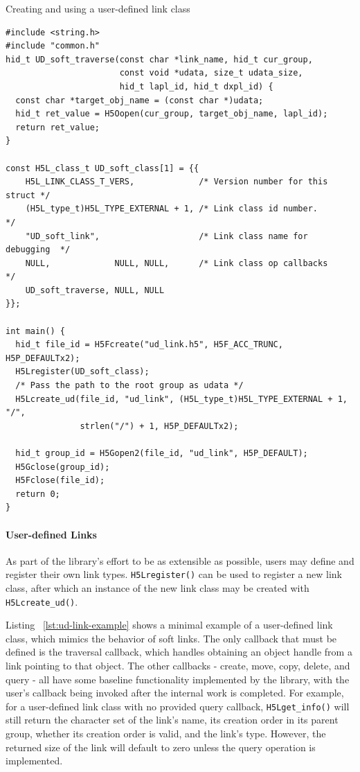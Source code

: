 \begin{listing}
\centering
\caption{Creating and using a user-defined link class}
\label{lst:ud-link-example}
\begin{verbatim}
#include <string.h>
#include "common.h"
hid_t UD_soft_traverse(const char *link_name, hid_t cur_group,
                       const void *udata, size_t udata_size, 
                       hid_t lapl_id, hid_t dxpl_id) {
  const char *target_obj_name = (const char *)udata;
  hid_t ret_value = H5Oopen(cur_group, target_obj_name, lapl_id);
  return ret_value;
}

const H5L_class_t UD_soft_class[1] = {{
    H5L_LINK_CLASS_T_VERS,             /* Version number for this struct */
    (H5L_type_t)H5L_TYPE_EXTERNAL + 1, /* Link class id number.          */
    "UD_soft_link",                    /* Link class name for debugging  */
    NULL,             NULL, NULL,      /* Link class op callbacks        */
    UD_soft_traverse, NULL, NULL
}};

int main() {
  hid_t file_id = H5Fcreate("ud_link.h5", H5F_ACC_TRUNC, H5P_DEFAULTx2);
  H5Lregister(UD_soft_class);
  /* Pass the path to the root group as udata */
  H5Lcreate_ud(file_id, "ud_link", (H5L_type_t)H5L_TYPE_EXTERNAL + 1, "/",
               strlen("/") + 1, H5P_DEFAULTx2);

  hid_t group_id = H5Gopen2(file_id, "ud_link", H5P_DEFAULT);
  H5Gclose(group_id);
  H5Fclose(file_id);
  return 0;
}

\end{verbatim}
\end{listing}

\paragraph{User-defined Links} As part of the library's effort to be as extensible as possible, users may define and register their own link types. \texttt{H5Lregister()} can be used to register a new link class, after which an instance of the new link class may be created with \texttt{H5Lcreate\_ud()}.  

Listing ~\ref{lst:ud-link-example} shows a minimal example of a user-defined link class, which mimics the behavior of soft links. The only callback that must be defined is the traversal callback, which handles obtaining an object handle from a link pointing to that object. The other callbacks - create, move, copy, delete, and query - all have some baseline functionality implemented by the library, with the user's callback being invoked after the internal work is completed. For example, for a user-defined link class with no provided query callback, \texttt{H5Lget\_info()} will still return the character set of the link's name, its creation order in its parent group, whether its creation order is valid, and the link's type. However, the returned size of the link will default to zero unless the query operation is implemented.

